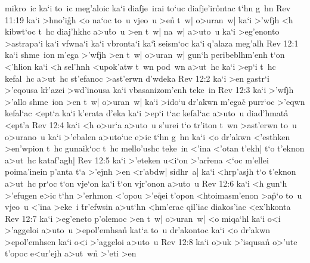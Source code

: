 mikro~ic
ka`i
to~ic
meg'aloic
ka`i
diafje~irai
to`uc
diafje'ir\r{o}ntac
t`hn
g~hn\bibvsend
\vs Rev 11:19
ka`i
>hno'i\r{g}h
<o
na`oc
to~u
vjeo~u
>e\r{n}
t~w|
o>uran~w|
ka`i
>'wfjh
<h
kibwt`oc
t~hc
diaj'hkhc
a>u\r{t}o~u
>en
t~w|
na~w|
a>uto~u
ka`i
>eg'enonto
>astrapa`i
ka`i
vfwna`i
ka`i
vbronta`i
ka`i\r{}
seism`oc
ka`i
q'alaza
meg'alh\bibvsend
\vs Rev 12:1
ka`i
shme~ion
m'ega
>'wfjh
>en
t~w|
o>uran~w|
gun`h
peribeblhm'enh
t`on
<'hlion
ka`i
<h
sel'hnh
<upok'atw
t~wn
pod~wn
a>ut~hc
ka`i
>ep`i
t~hc
kefal~hc
a>ut~hc
st'efanoc
>ast'erwn
d'wdeka\bibvsend
\vs Rev 12:2
ka`i
>en
gastr`i
>'eqousa
k\r{r}'azei
>wd'inousa
ka`i
vbasanizom'enh
teke~in\bibvsend
\vs Rev 12:3
ka`i
>'wfjh
>'allo
shme~ion
>en
t~w|
o>uran~w|
ka`i
>ido`u
dr'akwn
m'egac\r{}
purr`oc
>'eqwn
kefal`ac
<ept`a
ka`i
k'erata
d'eka
ka`i
>ep`i
t`ac
kefal`ac
a>uto~u
diad'hmata\r{}
<ept'a\bibvsend
\vs Rev 12:4
ka`i
<h
o>ur`a
a>uto~u
s'urei
t`o
tr'iton
t~wn
>ast'erwn
to~u
o>urano~u
ka`i
>'ebalen
a>uto`uc
e>ic
t`hn
g~hn
ka`i
<o
dr'akwn
<'esthken
>en'wpion
t~hc
gunaik`oc
t~hc
mello'ushc
teke~in
<'ina
<'otan
t'ekh|
t`o
t'eknon
a>ut~hc
kataf'agh|\bibvsend
\vs Rev 12:5
ka`i
>'eteken
u<i`on
>'ar\r{r}ena
<`oc
m'ellei
poima'inein
p'anta
t`a
>'ejnh
>en
<r'abdw|
sidhr~a|
ka`i
<hrp'asjh
t`o
t'eknon
a>ut~hc
pr`oc
t`on
vje`on
ka`i
\r{t}`on
vjr'onon
a>uto~u\bibvsend
\vs Rev 12:6
ka`i
<h
gun`h
>'efugen
e>ic
t`hn
>'erhmon
<'opou
>'e\r{q}ei
t'opon
<htoimasm'enon
>a\r{p}`o
to~u
vjeo~u
<'ina
>eke~i
\r{t}r'efwsin
a>ut`hn
<hm'erac
qil'iac
diakos'iac
<ex'hkonta\bibvsend
\vs Rev 12:7
ka`i
>eg'eneto
p'olemoc
>en
t~w|
o>uran~w|
<o
miqa`hl
ka`i
o<i
>'aggeloi
a>uto~u
>epol'emhsan\r{}
kat`a
to~u
dr'akontoc
ka`i
<o
dr'akwn
>epol'emhsen
ka`i
o<i
>'aggeloi
a>uto~u\bibvsend
\vs Rev 12:8
ka`i
o>uk
>'isqusan\r{}
o>'ute
t'opoc
e<ur'ejh
a>ut~w\r{n}
>'eti
>en
